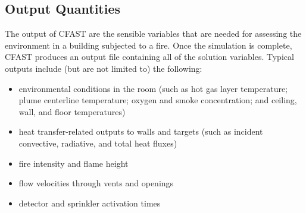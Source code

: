 \documentclass[11pt]{book}
\begin{document}
\subsection{Output Quantities}

The output of CFAST are the sensible variables that are needed for assessing the environment in a building subjected to a fire. Once the simulation is complete, CFAST produces an output file containing all of the solution variables.  Typical outputs include (but are not limited to) the following:
\begin{itemize}
\item environmental conditions in the room (such as hot gas layer temperature; plume centerline temperature; oxygen and smoke concentration; and ceiling, wall, and floor temperatures)
\item heat transfer-related outputs to walls and targets (such as incident convective, radiative, and total heat fluxes)
\item fire intensity and flame height
\item flow velocities through vents and openings
\item detector and sprinkler activation times
\end{itemize}
\end{document}
